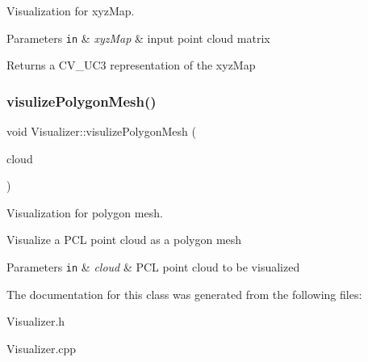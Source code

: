 Visualization for xyz\+Map. 


\begin{DoxyParams}[1]{Parameters}
\mbox{\tt in}  & {\em xyz\+Map} & input point cloud matrix \\
\hline
\end{DoxyParams}
\begin{DoxyReturn}{Returns}
a C\+V\+\_\+U\+C3 representation of the xyz\+Map 
\end{DoxyReturn}
\hypertarget{class_visualizer_a82702715f2ac30e555ccad3339375bf8}{}\label{class_visualizer_a82702715f2ac30e555ccad3339375bf8} 
\subsubsection{\texorpdfstring{visulize\+Polygon\+Mesh()}{visulizePolygonMesh()}}
{\footnotesize\ttfamily void Visualizer\+::visulize\+Polygon\+Mesh (\begin{DoxyParamCaption}\item[{pcl\+::\+Point\+Cloud$<$ pcl\+::\+Point\+X\+YZ $>$\+::Ptr}]{cloud }\end{DoxyParamCaption})\hspace{0.3cm}{\ttfamily [static]}}



Visualization for polygon mesh. 

Visualize a P\+CL point cloud as a polygon mesh 
\begin{DoxyParams}[1]{Parameters}
\mbox{\tt in}  & {\em cloud} & P\+CL point cloud to be visualized \\
\hline
\end{DoxyParams}


The documentation for this class was generated from the following files\+:\begin{DoxyCompactItemize}
\item 
Visualizer.\+h\item 
Visualizer.\+cpp\end{DoxyCompactItemize}
